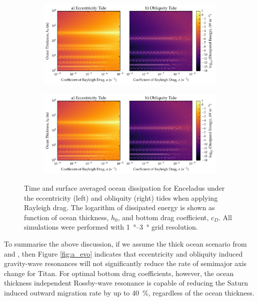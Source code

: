 \begin{figure}[!b]
    \centering
    \begin{subfigure}[t]{0.85\linewidth} %
        \includegraphics[width=\linewidth]{Figures/enceladus_linear}
        \label{fig:lincEccEncel}
    \end{subfigure}
    \begin{subfigure}[t]{0\linewidth} %
         \includegraphics[width=\linewidth]{Figures/enceladus_linear}
         \label{fig:linObliqEncel} 
    \end{subfigure}
    \vspace{-0.5cm}
\caption{Time and surface averaged ocean dissipation for Enceladus under the eccentricity (left) and obliquity (right) tides when applying Rayleigh drag. The logarithm of dissipated energy is shown as function of ocean thickness, $h_0$, and bottom drag coefficient, $c_D$. All simulations were performed with \SIrange{1}{3}{\degree} grid resolution. \label{fig:linEncel}}
\end{figure}

To summarise the above discussion, if we assume the thick ocean scenario from \citet{sohl2014structural} and \citet{baland2014titan}, then Figure \ref{fig:a_evo} indicates that eccentricity and obliquity induced gravity-wave resonances will not significantly reduce the rate of semimajor axis change for Titan. For optimal bottom drag coefficients, however, the ocean thickness independent Rossby-wave resonance is capable of reducing the Saturn induced outward migration rate by up to \SI{40}{\percent}, regardless of the ocean thickness.